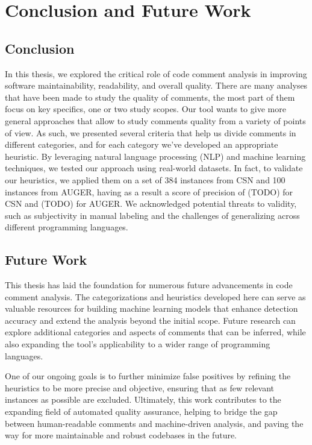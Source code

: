 
\chapter{Conclusion and Future Work} %

\label{Chapter5}


\section{Conclusion}
In this thesis, we explored the critical role of code comment analysis in improving software maintainability, readability, and overall quality. There are many analyses that have been made to study the quality of comments, the most part of them focus on key specifics, one or two study scopes. Our tool wants to give more general approaches that allow to study comments quality from a variety of points of view. As such, we presented several criteria that help us divide comments in different categories, and for each category we've developed an appropriate heuristic. By leveraging natural language processing (NLP) and machine learning techniques, we tested our approach using real-world datasets. In fact, to validate our heuristics, we applied them on a set of 384 instances from CSN and 100 instances from AUGER, having as a result a score of precision of (TODO) for CSN and (TODO) for AUGER. We acknowledged potential threats to validity, such as subjectivity in manual labeling and the challenges of generalizing across different programming languages.

\section{Future Work}
This thesis has laid the foundation for numerous future advancements in code comment analysis. The categorizations and heuristics developed here can serve as valuable resources for building machine learning models that enhance detection accuracy and extend the analysis beyond the initial scope. Future research can explore additional categories and aspects of comments that can be inferred, while also expanding the tool's applicability to a wider range of programming languages.

\noindent One of our ongoing goals is to further minimize false positives by refining the heuristics to be more precise and objective, ensuring that as few relevant instances as possible are excluded. Ultimately, this work contributes to the expanding field of automated quality assurance, helping to bridge the gap between human-readable comments and machine-driven analysis, and paving the way for more maintainable and robust codebases in the future.